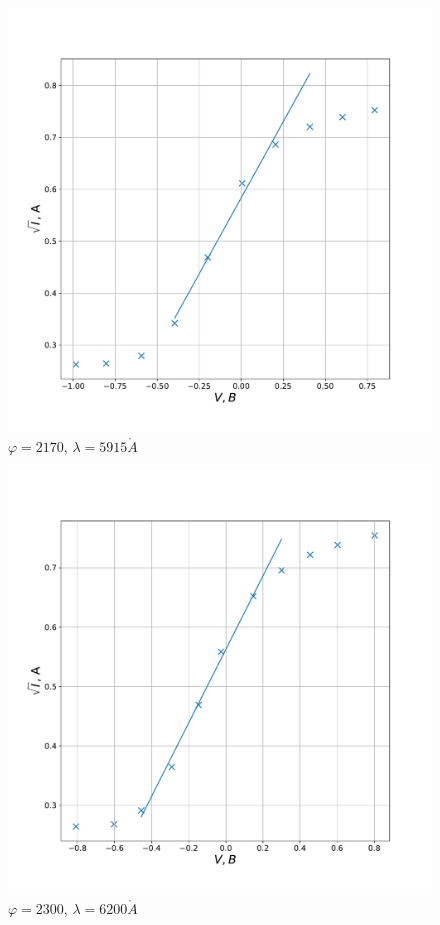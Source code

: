 \documentclass[a4paper, 12pt]{article}
\renewcommand{\phi}{\varphi}
\renewcommand{\AA}{\ensuremath{\mathring{A}}}
\begin{document}
\begin{figure}[!h]
    \centering
    \includegraphics[scale=0.35]{2170}
    \caption {$\phi = 2170$, $\lambda = 5915 \AA$}
\end{figure}

\begin{figure}[!h]
    \centering
    \includegraphics[scale=0.35]{2300}
    \caption {$\phi = 2300$, $\lambda = 6200 \AA$}
\end{figure}
\end{document}
